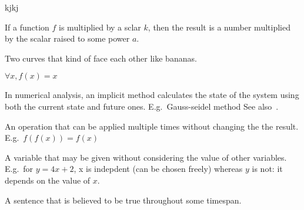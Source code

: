 \begin{definition}
    kjkj
\end{definition}

\begin{definition}[Homogenous]
    If a function $f$ is multiplied by a sclar $k$, then the result
    is a number multiplied by the scalar raised to some power $a$.
\end{definition}

\begin{definition}[Hyperbolic]
    Two curves that kind of face each other like bananas.
\end{definition}

\begin{definition}
    $\forall{x}, f (x) = x$
\end{definition}

\begin{definition}\label{implicitmethod}
    In numerical analysis, an implicit method calculates the state of the system
    using both the current state and future ones. E.g.\ Gauss-seidel method
    See also~.
\end{definition}

\begin{definition}[Idempotence]
    An operation that can be applied multiple times without changing the
    the result. E.g.\ $f (f (x)) = f (x) $
\end{definition}

\begin{definition}
    A variable that may be given without considering the value of other
    variables. E.g.\ for $y = 4x + 2$, x is indepdent (can be chosen freely)
    whereas $y$ is not: it depends on the value of $x$.
\end{definition}

\begin{definition}[Invariant]
    A sentence that is believed to be true throughout some timespan.
\end{definition}

